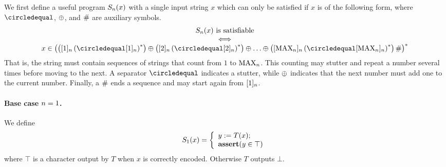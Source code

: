 We first define a useful program
${S_{n}}\mathord{\left( x \right)}$
with a single input string $x$ which can only be satisfied if $x$ is of the following form, where
$\numeq$, $\oplus$, and $\#$
are auxiliary symbols.
\[
    \begin{array}{c}
        \goodnums{\expheight}{x} \text{ is satisfiable} \\
        \iff \\
        x \in \brac{
            \brac{\tenc{\expheight}{1} \brac{\numeq \tenc{\expheight}{1}}^\ast}
            \numplus
            \brac{\tenc{\expheight}{2} \brac{\numeq \tenc{\expheight}{2}}^\ast}
            \numplus
            \ldots
            \numplus
            \brac{
                \tenc{\expheight}{\nmax{\expheight}}
                    \brac{\numeq \tenc{\expheight}{\nmax{\expheight}}}^\ast
            }
            \numsep
        }^\ast
    \end{array}
\]
That is, the string must contain sequences of strings that count from $1$ to $\text{MAX}_{n}$.
This counting may stutter and repeat a number several times before moving to the next.
A separator $\numeq$ indicates a stutter, while $\oplus$ indicates that the next number must add one to the current number.
Finally, a $\#$ ends a sequence and may start again from $[1]_{n}$.

\paragraph{Base case $n = 1$.}

We define
\[
    {S_{1}}\mathord{\left( x \right)} = \left\{
        \begin{array}{l}
            y := {T}\mathord{\left( x \right)}; \\
            \textbf{assert}(y \in \top)
        \end{array}
    \right.
\]
where $\top$ is a character output by $T$ when $x$ is correctly encoded.
Otherwise $T$ outputs $\bot$.


